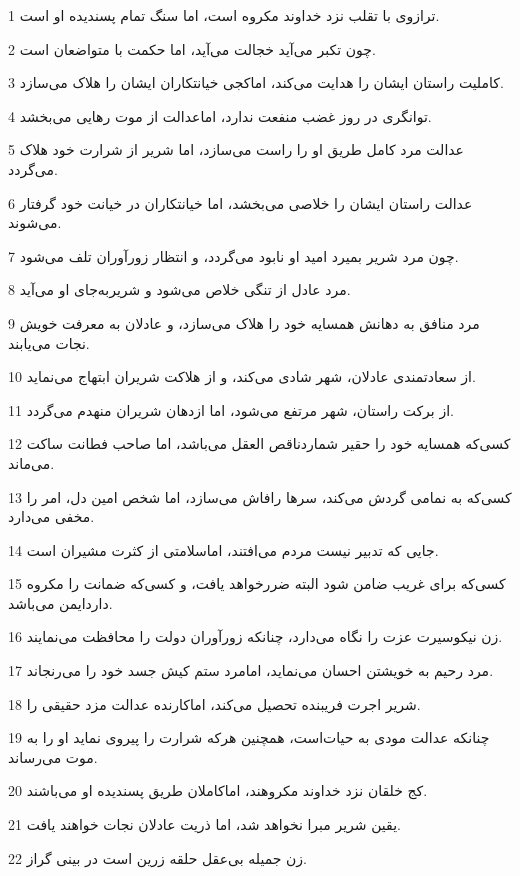 \par 1 ترازوی با تقلب نزد خداوند مکروه است، اما سنگ تمام پسندیده او است.
\par 2 چون تکبر می‌آید خجالت می‌آید، اما حکمت با متواضعان است.
\par 3 کاملیت راستان ایشان را هدایت می‌کند، اماکجی خیانتکاران ایشان را هلاک می‌سازد.
\par 4 توانگری در روز غضب منفعت ندارد، اماعدالت از موت رهایی می‌بخشد.
\par 5 عدالت مرد کامل طریق او را راست می‌سازد، اما شریر از شرارت خود هلاک می‌گردد.
\par 6 عدالت راستان ایشان را خلاصی می‌بخشد، اما خیانتکاران در خیانت خود گرفتار می‌شوند.
\par 7 چون مرد شریر بمیرد امید او نابود می‌گردد، و انتظار زورآوران تلف می‌شود.
\par 8 مرد عادل از تنگی خلاص می‌شود و شریربه‌جای او می‌آید.
\par 9 مرد منافق به دهانش همسایه خود را هلاک می‌سازد، و عادلان به معرفت خویش نجات می‌یابند.
\par 10 از سعادتمندی عادلان، شهر شادی می‌کند، و از هلاکت شریران ابتهاج می‌نماید.
\par 11 از برکت راستان، شهر مرتفع می‌شود، اما ازدهان شریران منهدم می‌گردد.
\par 12 کسی‌که همسایه خود را حقیر شماردناقص العقل می‌باشد، اما صاحب فطانت ساکت می‌ماند.
\par 13 کسی‌که به نمامی گردش می‌کند، سرها رافاش می‌سازد، اما شخص امین دل، امر را مخفی می‌دارد.
\par 14 جایی که تدبیر نیست مردم می‌افتند، اماسلامتی از کثرت مشیران است.
\par 15 کسی‌که برای غریب ضامن شود البته ضررخواهد یافت، و کسی‌که ضمانت را مکروه داردایمن می‌باشد.
\par 16 زن نیکوسیرت عزت را نگاه می‌دارد، چنانکه زورآوران دولت را محافظت می‌نمایند.
\par 17 مرد رحیم به خویشتن احسان می‌نماید، امامرد ستم کیش جسد خود را می‌رنجاند.
\par 18 شریر اجرت فریبنده تحصیل می‌کند، اماکارنده عدالت مزد حقیقی را.
\par 19 چنانکه عدالت مودی به حیات‌است، همچنین هر‌که شرارت را پیروی نماید او را به موت می‌رساند.
\par 20 کج خلقان نزد خداوند مکروهند، اماکاملان طریق پسندیده او می‌باشند.
\par 21 یقین شریر مبرا نخواهد شد، اما ذریت عادلان نجات خواهند یافت.
\par 22 زن جمیله بی‌عقل حلقه زرین است در بینی گراز.
